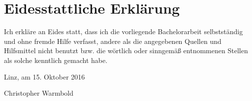 \chapter*{Eidesstattliche Erkl\"arung}

Ich erkl\"are an Eides statt, dass ich die vorliegende Bachelorarbeit selbstst\"andig und ohne fremde Hilfe verfasst, andere als die angegebenen Quellen und Hilfsmittel nicht benutzt bzw. die w\"ortlich oder sinngem\"a{\ss} entnommenen Stellen als solche kenntlich gemacht habe.

Linz, am 15. Oktober 2016

\hfill Christopher Warmbold
